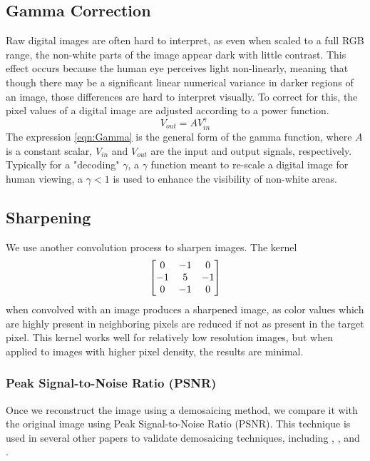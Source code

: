 \documentclass{article}\twocolumn
\begin{document}
\subsection{Gamma Correction}
    Raw digital images are often hard to interpret, as even when scaled to a full RGB range, the non-white parts of the image appear dark with little contrast. This effect occurs because the human eye perceives light non-linearly, meaning that though there may be a significant linear numerical variance in darker regions of an image, those differences are hard to interpret visually. To correct for this, the pixel values of a digital image are adjusted according to a power function. 
    \begin{equation}
        V_{out} = AV_{in}^{\gamma} \label{eqn:Gamma}
    \end{equation}
    The expression \eqref{eqn:Gamma} is the general form of the gamma function, where $A$ is a constant scalar, $V_{in}$ and $V_{out}$ are the input and output signals, respectively. 
    Typically for a "decoding" $\gamma$, a $\gamma$  function meant to re-scale a digital image for human viewing, a $\gamma < 1$ is used to enhance the visibility of non-white areas. 
\subsection{Sharpening}
    We use another convolution process to sharpen images. The kernel 
    \begin{align}
        \begin{bmatrix} 0 & -1 & 0 \\ -1 & 5 & -1 \\ 0 & -1 & 0 \end{bmatrix}
    \end{align}
    when convolved with an image produces a sharpened image, as color values which are highly present in neighboring pixels are reduced if not as present in the target pixel. This kernel works well for relatively low resolution images, but when applied to images with higher pixel density, the results are minimal. 

\subsubsection{Peak Signal-to-Noise Ratio (PSNR)}

Once we reconstruct the image using a demosaicing method, we compare it with the original image using Peak Signal-to-Noise Ratio (PSNR). This technique is used in several other papers to validate demosaicing techniques, including \cite{zapryanov_comparative_2008}, \cite{lukin_high-quality_2004}, and \cite{kimmel_demosaicing:_1999}.
\end{document}
